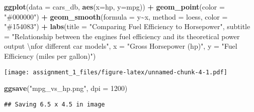 \documentclass[
]{article}
\newenvironment{Shaded}{\begin{snugshade}}{\end{snugshade}}
\newcommand{\CharTok}[1]{\textcolor[rgb]{0.31,0.60,0.02}{#1}}
\newcommand{\DataTypeTok}[1]{\textcolor[rgb]{0.13,0.29,0.53}{#1}}
\newcommand{\DecValTok}[1]{\textcolor[rgb]{0.00,0.00,0.81}{#1}}
\newcommand{\KeywordTok}[1]{\textcolor[rgb]{0.13,0.29,0.53}{\textbf{#1}}}
\newcommand{\NormalTok}[1]{#1}
\newcommand{\OperatorTok}[1]{\textcolor[rgb]{0.81,0.36,0.00}{\textbf{#1}}}
\newcommand{\StringTok}[1]{\textcolor[rgb]{0.31,0.60,0.02}{#1}}
\begin{document}
\begin{Shaded}
\begin{Highlighting}[]
\KeywordTok{ggplot}\NormalTok{(}\DataTypeTok{data =}\NormalTok{ cars\_db, }\KeywordTok{aes}\NormalTok{(}\DataTypeTok{x=}\NormalTok{hp, }\DataTypeTok{y=}\NormalTok{mpg)) }\OperatorTok{+}\StringTok{ }\KeywordTok{geom\_point}\NormalTok{(}\DataTypeTok{color =} \StringTok{"\#000000"}\NormalTok{) }\OperatorTok{+}\StringTok{ }
\StringTok{  }\KeywordTok{geom\_smooth}\NormalTok{(}\DataTypeTok{formula =}\NormalTok{ y}\OperatorTok{\textasciitilde{}}\NormalTok{x, }\DataTypeTok{method =} \StringTok{\textquotesingle{}loess\textquotesingle{}}\NormalTok{, }\DataTypeTok{color =} \StringTok{"\#154083"}\NormalTok{) }\OperatorTok{+}
\StringTok{  }\KeywordTok{labs}\NormalTok{(}\DataTypeTok{title =} \StringTok{"Comparing Fuel Efficiency to Horsepower"}\NormalTok{,}
       \DataTypeTok{subtitle =} \StringTok{"Relationship between the engine\textquotesingle{}s fuel efficiency and its theoretical power output }\CharTok{\textbackslash{}n}\StringTok{for different car models"}\NormalTok{,}
       \DataTypeTok{x =} \StringTok{"Gross Horsepower (hp)"}\NormalTok{,}
       \DataTypeTok{y =} \StringTok{"Fuel Efficiency (miles per gallon)"}\NormalTok{)}
\end{Highlighting}
\end{Shaded}

\texttt{[image: assignment\_1\_files/figure-latex/unnamed-chunk-4-1.pdf]}

\begin{Shaded}
\begin{Highlighting}[]
\KeywordTok{ggsave}\NormalTok{(}\StringTok{"mpg\_vs\_hp.png"}\NormalTok{, }\DataTypeTok{dpi =} \DecValTok{1200}\NormalTok{)}
\end{Highlighting}
\end{Shaded}

\begin{verbatim}
## Saving 6.5 x 4.5 in image
\end{verbatim}
\end{document}
